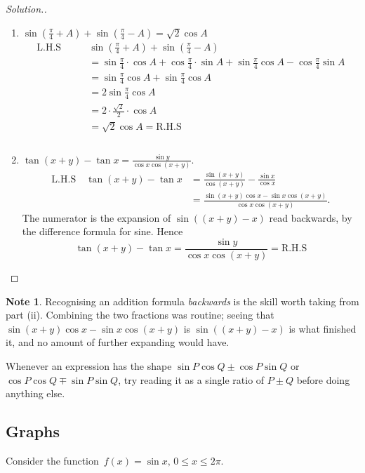 \documentclass[11pt,a4paper]{article}
\theoremstyle{definition}
\newtheorem{note}[thm]{Note}
\newenvironment{solution}
  {\renewcommand{\qedsymbol}{}\begin{proof}[\textit{Solution}.]}
  {\end{proof}}
\begin{document}
\begin{solution}

\begin{enumerate}
\item[i.]$\sin \left(\frac{\pi}{4} + A\right) + \sin \left( \frac{\pi}{4} - A\right)  = \sqrt{2}\cos A$
\begin{align*}
\text{L.H.S}\qquad  & \sin \left(\frac{\pi}{4} + A\right) + \sin \left( \frac{\pi}{4} - A\right)\\  
& = \sin \frac{\pi}{4}\cdot \cos A + \cos \frac{\pi}{4}\cdot\sin A + \sin \frac{\pi}{4} \cos A - \cos \frac{\pi}{4} \sin A \\
& = \sin \frac{\pi}{4}\cos A + \sin \frac{\pi}{4}\cos A\\
& = 2\sin \frac{\pi}{4}\cos A\\
& = 2\cdot \frac{\sqrt{2}}{2}\cdot \cos A\\
& = \sqrt{2}\cos A = \text{R.H.S}\\\\
\end{align*}

\item[ii.] $\tan (x + y) - \tan x = \frac{\sin y}{\cos x\cos (x+y)}$.
\begin{align*}
\text{L.H.S}\quad  \tan(x+y)-\tan x
 &= \frac{\sin(x+y)}{\cos(x+y)}-\frac{\sin x}{\cos x}\\[4pt]
 &= \frac{\sin(x+y)\cos x-\sin x\cos(x+y)}{\cos x\cos(x+y)} .
\end{align*}
The numerator is the expansion of $\sin\left((x+y)-x\right)$ read backwards, by the
difference formula for sine. Hence
$$\tan(x+y)-\tan x=\frac{\sin y}{\cos x\cos(x+y)}=\text{R.H.S}$$
\end{enumerate}
\end{solution}

\begin{note}
Recognising an addition formula \emph{backwards} is the skill worth taking from
part (ii). Combining the two fractions was routine; seeing that
$\sin(x+y)\cos x-\sin x\cos(x+y)$ is $\sin\left((x+y)-x\right)$ is what finished
it, and no amount of further expanding would have.

Whenever an expression has the shape $\sin P\cos Q\pm\cos P\sin Q$ or
$\cos P\cos Q\mp\sin P\sin Q$, try reading it as a single ratio of $P\pm Q$ before
doing anything else.
\end{note}
\subsection{Graphs}
Consider the function $\, f(x) = \sin x , \, 0 \leq x \leq 2\pi$.\\
\end{document}
